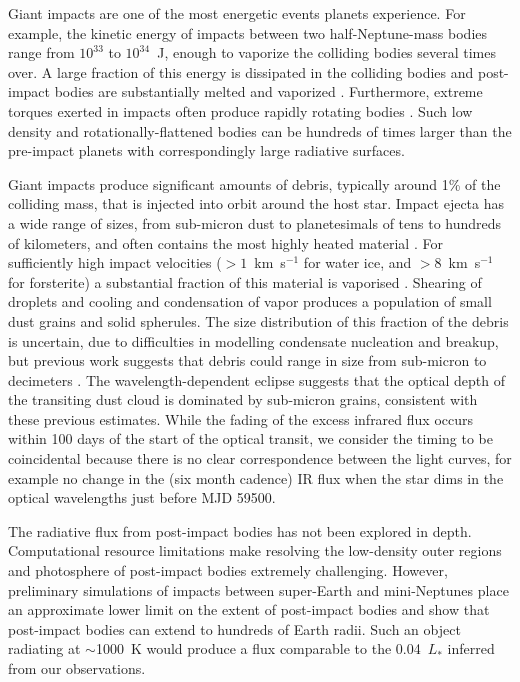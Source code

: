 \documentclass[sn-nature]{sn-jnl}%
\begin{document}
Giant impacts are one of the most energetic events planets experience.
%
For example, the kinetic energy of impacts between two half-Neptune-mass bodies range from $10^{33}$ to $10^{34}$~J, enough to vaporize the colliding bodies several times over.
%
A large fraction of this energy is dissipated in the colliding bodies and post-impact bodies are substantially melted and vaporized \cite{Nakajima2015,Lock2017,Carter2020}.
%
Furthermore, extreme torques exerted in impacts often produce rapidly rotating bodies \cite{Lock2017}.
%
Such low density and rotationally-flattened bodies can be hundreds of times larger than the pre-impact planets \cite{Lock2017} with correspondingly large radiative surfaces.


Giant impacts produce significant amounts of debris, typically around 1\% of the colliding mass, that is injected into orbit around the host star\cite{Canup2001,Lock18}.
%
Impact ejecta has a wide range of sizes, from sub-micron dust to planetesimals of tens to hundreds of kilometers, and often contains the most highly heated material \cite{Benz2008_Mercury_book,Leinhardt2015,Carter2020a}.
%
For sufficiently high impact velocities ($>1$~km~s$^{-1}$ for water ice, and $>8$~km~s$^{-1}$ for forsterite) a substantial fraction of this material is vaporised \cite{Stewart2008,Davies2020,Carter2020a}.
%
Shearing of droplets and cooling and condensation of vapor produces a population of small dust grains and solid spherules.
%
The size distribution of this fraction of the debris is uncertain, due to difficulties in modelling condensate nucleation and breakup, but previous work suggests that debris could range in size from sub-micron to decimeters \cite{Benz2008_Mercury_book,Johnson2015}.
%
The wavelength-dependent eclipse suggests that the optical depth of the transiting dust cloud is dominated by sub-micron grains, consistent with these previous estimates.
%
While the fading of the excess infrared flux occurs within 100 days of the start of the optical transit, we consider the timing to be coincidental because there is no clear correspondence between the light curves, for example no  change in the (six month cadence) IR flux when the star dims in the optical wavelengths just before MJD 59500.




The radiative flux from post-impact bodies has not been explored in depth.
%
Computational resource limitations make resolving the low-density outer regions and photosphere of post-impact bodies extremely challenging.
%
However, preliminary simulations of impacts between super-Earth and mini-Neptunes place an approximate lower limit on the extent of post-impact bodies and show that post-impact bodies can extend to hundreds of Earth radii.
%
Such an object radiating at $\sim$1000~K would produce a flux comparable to the 0.04~$L_*$ inferred from our observations. 
\end{document}
